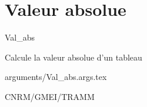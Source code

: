 %
\section{Valeur absolue}

 {\sf Val\_abs}

\bigskip
{}
Calcule la valeur absolue d'un tableau


\bigskip
 {arguments/Val_abs.args.tex}


\bigskip
{}


\bigskip
{}
CNRM/GMEI/TRAMM

\bigskip
{}
